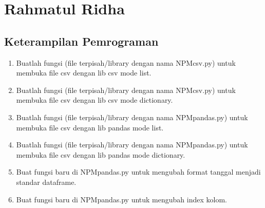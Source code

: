 \section{Rahmatul Ridha}
\subsection{Keterampilan Pemrograman}
\begin{enumerate}
	\item Buatlah  fungsi  (file  terpisah/library  dengan  nama  NPMcsv.py)  untuk  membuka file csv dengan lib csv mode list.
	
	
	
	\item Buatlah  fungsi  (file  terpisah/library  dengan  nama  NPMcsv.py)  untuk  membuka file csv dengan lib csv mode dictionary.
	
	
	
	\item Buatlah fungsi (file terpisah/library dengan nama NPMpandas.py) untuk membuka file csv dengan lib pandas mode list.
	
	
	
	\item Buatlah fungsi (file terpisah/library dengan nama NPMpandas.py) untuk membuka file csv dengan lib pandas mode dictionary.
	
	
	
	\item  Buat fungsi baru di NPMpandas.py untuk mengubah format tanggal menjadi standar dataframe.
	
	
	
	\item Buat fungsi baru di NPMpandas.py untuk mengubah index kolom.
	

\end{enumerate}
